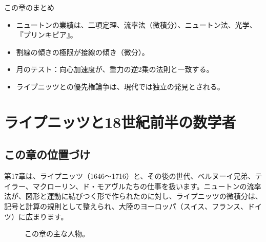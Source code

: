 \documentclass[a4paper,11pt,openany]{ltjsbook}
\begin{document}
\begin{pointbox}{この章のまとめ}
\begin{itemize}[leftmargin=*]
\item ニュートンの業績は、二項定理、流率法（微積分）、ニュートン法、光学、『プリンキピア』。
\item 割線の傾きの極限が接線の傾き（微分）。
\item 月のテスト：向心加速度が、重力の逆2乗の法則と一致する。
\item ライプニッツとの優先権論争は、現代では独立の発見とされる。
\end{itemize}
\end{pointbox}

\chapter{ライプニッツと18世紀前半の数学者}

\section{この章の位置づけ}

第17章は、ライプニッツ（1646〜1716）と、その後の世代、ベルヌーイ兄弟、テイラー、マクローリン、ド・モアヴルたちの仕事を扱います。ニュートンの流率法が、図形と運動に結びつく形で作られたのに対し、ライプニッツの微積分は、記号と計算の規則として整えられ、大陸のヨーロッパ（スイス、フランス、ドイツ）に広まります。

\begin{figure}[htbp]
\centering
{}
\caption{この章の主な人物。}
\end{figure}
\end{document}
